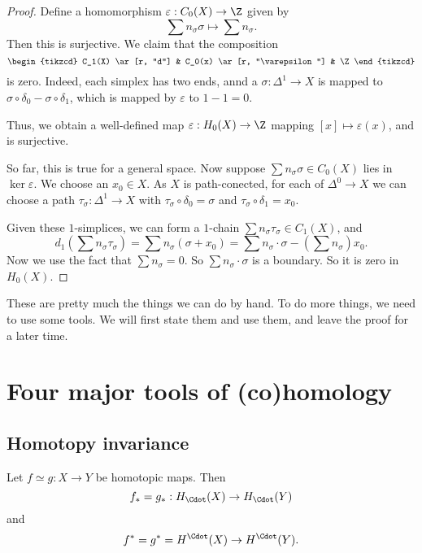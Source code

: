 \documentclass[a4paper]{article}
\begin{document}
\begin{proof}
  Define a homomorphism $\varepsilon: C_0(X) \to \Z$ given by
  \[
    \sum n_\sigma \sigma \mapsto \sum n_\sigma.
  \]
  Then this is surjective. We claim that the composition
  \[
    \begin{tikzcd}
      C_1(X) \ar[r, "d"] & C_0(x) \ar[r, "\varepsilon"] & \Z
    \end{tikzcd}
  \]
  is zero. Indeed, each simplex has two ends, annd a $\sigma: \Delta^1 \to X$ is mapped to $\sigma \circ \delta_0 - \sigma \circ \delta_1$, which is mapped by $\varepsilon$ to $1 - 1 = 0$.

  Thus, we obtain a well-defined map $\varepsilon: H_0(X) \to \Z$ mapping $[x] \mapsto \varepsilon(x)$, and is surjective.

  So far, this is true for a general space. Now suppose $\sum n_\sigma \sigma \in C_0(X)$ lies in $\ker \varepsilon$. We choose an $x_0 \in X$. As $X$ is path-conected, for each of $\Delta^0 \to X$ we can choose a path $\tau_\sigma: \Delta^1 \to X$ with $\tau_\sigma \circ \delta_0 = \sigma$ and $\tau_\sigma \circ \delta_1 = x_0$.

  Given these $1$-simplices, we can form a $1$-chain $\sum n_\sigma \tau_\sigma \in C_1(X)$, and
  \[
    d_1\left(\sum n_\sigma \tau_\sigma\right)= \sum n_\sigma(\sigma + x_0)  = \sum n_\sigma \cdot \sigma - \left(\sum n_\sigma\right) x_0.
  \]
  Now we use the fact that $\sum n_\sigma = 0$.  So $\sum n_\sigma \cdot \sigma$ is a boundary. So it is zero in $H_0(X)$.
\end{proof}

These are pretty much the things we can do by hand. To do more things, we need to use some tools. We will first state them and use them, and leave the proof for a later time.

\section{Four major tools of (co)homology}
\subsection{Homotopy invariance}
\begin{thm}
  Let $f \simeq g: X \to Y$ be homotopic maps. Then
  \[
    f_* = g_*: H_{\Cdot}(X) \to H_{\Cdot}(Y) 
  \]
  and
  \[
    f^* = g^* = H^{\Cdot}(X) \to H^{\Cdot}(Y).
  \]
\end{thm}
\end{document}
